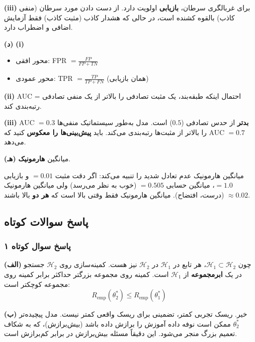 \documentclass[12pt,a4paper]{article}
\begin{document}
\textbf{(iii)} برای غربالگری سرطان، \textbf{بازیابی} اولویت دارد. از دست دادن مورد سرطان (منفی کاذب) بالقوه کشنده است، در حالی که هشدار کاذب (مثبت کاذب) فقط آزمایش اضافی و اضطراب دارد.

\bigskip

\textbf{(د)} \textbf{(i)}
\begin{itemize}
\item محور افقی: FPR $= \frac{FP}{FP + TN}$
\item محور عمودی: TPR $= \frac{TP}{TP + FN}$ (همان بازیابی)
\end{itemize}

\textbf{(ii)} AUC = احتمال اینکه طبقه‌بند، یک مثبت تصادفی را بالاتر از یک منفی تصادفی رتبه‌بندی کند.

\textbf{(iii)} AUC $= 0.3$ \textbf{بدتر} از حدس تصادفی ($0.5$) است. مدل به‌طور سیستماتیک منفی‌ها را بالاتر از مثبت‌ها رتبه‌بندی می‌کند. باید \textbf{پیش‌بینی‌ها را معکوس} کنید که AUC $= 0.7$ می‌دهد.

\bigskip

\textbf{(هـ)} میانگین \textbf{هارمونیک}.

میانگین هارمونیک عدم تعادل شدید را تنبیه می‌کند: اگر دقت مثبت $= 0.01$ و بازیابی $= 1.0$، میانگین حسابی $= 0.505$ (خوب به نظر می‌رسد) ولی میانگین هارمونیک $\approx 0.02$ (درست، افتضاح). میانگین هارمونیک فقط وقتی بالا است که \textbf{هر دو} بالا باشند.

\newpage

\subsection*{پاسخ سوالات کوتاه}

\subsubsection*{پاسخ سوال کوتاه ۱}

\textbf{(الف)} چون $\mathcal{H}_1 \subset \mathcal{H}_2$، هر تابع در $\mathcal{H}_1$ در $\mathcal{H}_2$ نیز هست. کمینه‌سازی روی $\mathcal{H}_2$ جستجو در یک \textbf{ابرمجموعه} از $\mathcal{H}_1$ است. کمینه روی مجموعه بزرگتر حداکثر برابر کمینه روی مجموعه کوچکتر است:
$$R_{\text{emp}}(\theta_2^*) \leq R_{\text{emp}}(\theta_1^*)$$

\textbf{(ب)} خیر. ریسک تجربی کمتر، تضمینی برای ریسک واقعی کمتر نیست. مدل پیچیده‌تر $\theta_2^*$ ممکن است نوفه داده آموزش را برازش داده باشد (بیش‌برازش)، که به شکاف تعمیم بزرگ منجر می‌شود. این دقیقاً مسئله بیش‌برازش در برابر کم‌برازش است.
\end{document}
